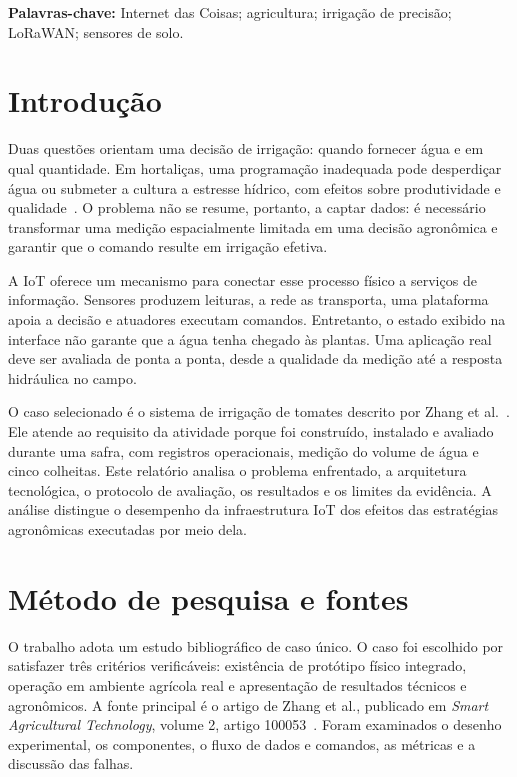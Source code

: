 \documentclass[11pt,a4paper]{article}
\begin{document}
\noindent\textbf{Palavras-chave:} Internet das Coisas; agricultura; irrigação de precisão; LoRaWAN; sensores de solo.

\section{Introdução}
Duas questões orientam uma decisão de irrigação: quando fornecer água e em qual quantidade. Em hortaliças, uma programação inadequada pode desperdiçar água ou submeter a cultura a estresse hídrico, com efeitos sobre produtividade e qualidade~\cite{zhang2022}. O problema não se resume, portanto, a captar dados: é necessário transformar uma medição espacialmente limitada em uma decisão agronômica e garantir que o comando resulte em irrigação efetiva.

A IoT oferece um mecanismo para conectar esse processo físico a serviços de informação. Sensores produzem leituras, a rede as transporta, uma plataforma apoia a decisão e atuadores executam comandos. Entretanto, o estado exibido na interface não garante que a água tenha chegado às plantas. Uma aplicação real deve ser avaliada de ponta a ponta, desde a qualidade da medição até a resposta hidráulica no campo.

O caso selecionado é o sistema de irrigação de tomates descrito por Zhang et al.~\cite{zhang2022}. Ele atende ao requisito da atividade porque foi construído, instalado e avaliado durante uma safra, com registros operacionais, medição do volume de água e cinco colheitas. Este relatório analisa o problema enfrentado, a arquitetura tecnológica, o protocolo de avaliação, os resultados e os limites da evidência. A análise distingue o desempenho da infraestrutura IoT dos efeitos das estratégias agronômicas executadas por meio dela.

\section{Método de pesquisa e fontes}
O trabalho adota um estudo bibliográfico de caso único. O caso foi escolhido por satisfazer três critérios verificáveis: existência de protótipo físico integrado, operação em ambiente agrícola real e apresentação de resultados técnicos e agronômicos. A fonte principal é o artigo de Zhang et al., publicado em \textit{Smart Agricultural Technology}, volume 2, artigo 100053~\cite{zhang2022}. Foram examinados o desenho experimental, os componentes, o fluxo de dados e comandos, as métricas e a discussão das falhas.
\end{document}
